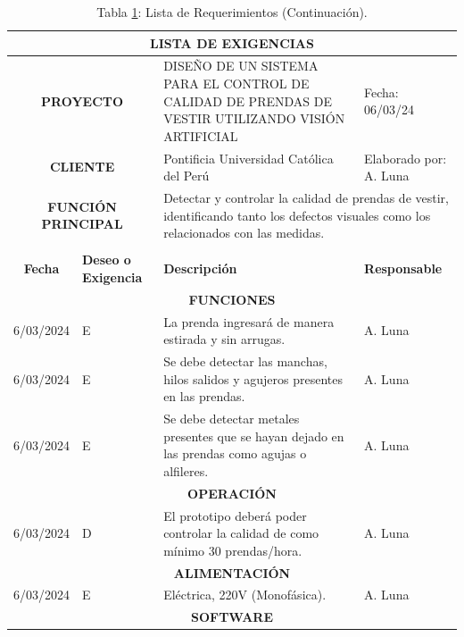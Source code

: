 \begin{longtable}{|c|p{4.5em}|p{22.5em}|p{6em}|}
	\caption[Lista de Requerimientos.]{Lista de Requerimientos. Fuente: Elaboración propia.}\label{tab:lista_exigencias}\\
	\hline
	\multicolumn{4}{|p{37.5em}|}{\textbf{LISTA DE EXIGENCIAS}} \bigstrut\\
	\hline
	\multicolumn{2}{|p{9em}|}{\textbf{PROYECTO}} & DISEÑO DE UN SISTEMA PARA EL CONTROL DE CALIDAD DE PRENDAS DE VESTIR UTILIZANDO VISIÓN ARTIFICIAL & Fecha: 06/03/24 \bigstrut\\
	\hline
	\multicolumn{2}{|p{9em}|}{\textbf{CLIENTE}} & Pontificia Universidad Católica del Perú & Elaborado por: A. Luna \bigstrut\\
	\hline
	\multicolumn{2}{|p{9em}|}{\parbox{4cm}{\textbf{FUNCIÓN} \\ \textbf{PRINCIPAL}}
	} & \multicolumn{2}{p{28.5em}|}{Detectar y controlar la calidad de prendas de vestir, identificando tanto los defectos visuales como los relacionados con las medidas.} \bigstrut\\
	\hline
	\endfirsthead \caption* {Tabla \ref{tab:lista_exigencias}: Lista de Requerimientos (Continuación).}\\
	\hline
	\multicolumn{1}{|p{4.5em}|}{\textbf{Fecha}} & \textbf{Deseo o Exigencia} & \textbf{Descripción} & \textbf{Responsable} \bigstrut\\
	\hline
	\endhead
	\multicolumn{4}{|p{37.5em}|}{\textbf{FUNCIONES}} \bigstrut\\
	\hline
	6/03/2024 & E     & La prenda ingresará de manera estirada y sin arrugas. & A. Luna \bigstrut\\
	\hline
	6/03/2024 & E     & Se debe detectar las manchas, hilos salidos y agujeros presentes en las prendas. & A. Luna \bigstrut\\
	\hline
	6/03/2024 & E     & Se debe detectar metales presentes que se hayan dejado en las prendas como agujas o alfileres. & A. Luna \bigstrut\\
	\hline
	\multicolumn{4}{|p{37.5em}|}{\textbf{OPERACIÓN}} \bigstrut\\
	\hline
	6/03/2024 & D     & El prototipo deberá poder controlar la calidad de como mínimo 30 prendas/hora. & A. Luna \bigstrut\\
	\hline
	\multicolumn{4}{|p{37.5em}|}{\textbf{ALIMENTACIÓN}} \bigstrut\\
	\hline
	6/03/2024 & E     & Eléctrica, 220V (Monofásica). & A. Luna \bigstrut\\
	\hline
	\multicolumn{4}{|p{37.5em}|}{\textbf{SOFTWARE}} \bigstrut\\

\end{longtable}
